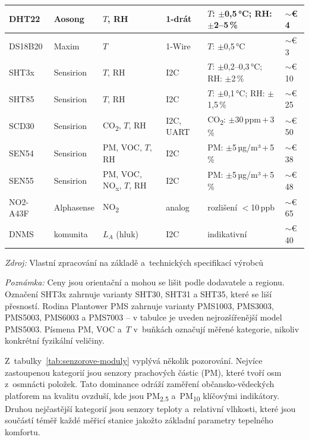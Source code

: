 {\begin{longtable}{L{2.5cm} L{1.8cm} L{3.2cm} L{1.5cm} L{3.8cm} R{1.2cm}}
    \hline
    DHT22 & Aosong & $T$, RH & 1-drát & $T$: $\pm$0,5\,°C; RH: $\pm$2--5\,\% & ${\sim}$€\,4 \\
    \hline
    DS18B20 & Maxim & $T$ & 1-Wire & $T$: $\pm$0,5\,°C & ${\sim}$€\,3 \\
    \hline
    SHT3x & Sensirion & $T$, RH & I2C & $T$: $\pm$0,2--0,3\,°C; RH: $\pm$2\,\% & ${\sim}$€\,10 \\
    \hline
    SHT85 & Sensirion & $T$, RH & I2C & $T$: $\pm$0,1\,°C; RH: $\pm$1,5\,\% & ${\sim}$€\,25 \\
    \hline
    SCD30 & Sensirion & CO\textsubscript{2}, $T$, RH & I2C, UART & CO\textsubscript{2}: $\pm$30\,ppm\,+\,3\,\% & ${\sim}$€\,50 \\
    \hline
    SEN54 & Sensirion & PM, VOC, $T$, RH & I2C & PM: $\pm$5\,µg/m³\,+\,5\,\% & ${\sim}$€\,38 \\
    \hline
    SEN55 & Sensirion & PM, VOC, NO\textsubscript{x}, $T$, RH & I2C & PM: $\pm$5\,µg/m³\,+\,5\,\% & ${\sim}$€\,48 \\
    \hline
    NO2-A43F & Alphasense & NO\textsubscript{2} & analog & rozlišení $<$10\,ppb & ${\sim}$€\,65 \\
    \hline
    DNMS & komunita & $L_A$ (hluk) & I2C & indikativní & ${\sim}$€\,40 \\
  \end{longtable}

  \footnotesize \textit{Zdroj:} Vlastní zpracování na základě \parencite{SensorCommunityDevices} a~technických specifikací výrobců \parencite{NovaPMSensor, agSPS30PM25Sensor, LaserPM25Sensor, agSCD30CO2Accuracy, agSEN55EnvironmentalSensor, HumiditySensorBME280, DS18B20ProgrammableResolution, liuDigitaloutputRelativeHumidity, NitrogenDioxideSensor, HoneywellHPMSeries, PPD42NSParticleSensor, OpticalFineDust, IPS71001PIERASYSTEMS, agSHT31DISB20100RH, agSHT8515Digital, david@riallant.comNextPMValidatedPM2025}

  \footnotesize \textit{Poznámka:} Ceny jsou orientační a mohou se lišit podle dodavatele a regionu. Označení SHT3x zahrnuje varianty SHT30, SHT31 a SHT35, které se liší přesností. Rodina Plantower PMS zahrnuje varianty PMS1003, PMS3003, PMS5003, PMS6003 a PMS7003 -- v tabulce je uveden nejrozšířenější model PMS5003. Písmena PM, VOC a~$T$ v~buňkách označují měřené kategorie, nikoliv konkrétní fyzikální veličiny.
}

Z~tabulky~\ref{tab:senzorove-moduly} vyplývá několik pozorování. Nejvíce zastoupenou kategorií jsou senzory prachových částic (PM), které tvoří osm z~osmnácti položek. Tato dominance odráží zaměření občansko-vědeckých platforem na kvalitu ovzduší, kde jsou PM\textsubscript{2.5} a~PM\textsubscript{10} klíčovými indikátory. Druhou nejčastější kategorií jsou senzory teploty a~relativní vlhkosti, které jsou součástí téměř každé měřicí stanice jakožto základní parametry tepelného komfortu.


